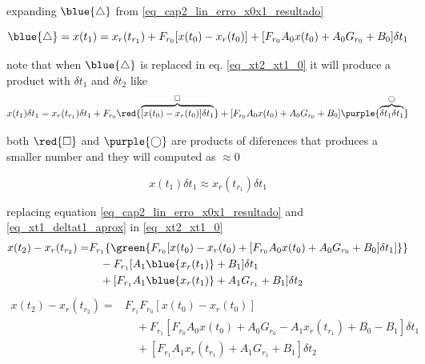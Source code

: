 expanding $\blue{\triangle}$ from \ref{eq_cap2_lin_erro_x0x1_resultado}

\begin{equation}
	\blue{\triangle} = x(t_1) = x_r(t_{r_1}) + F_{r_0} [ x(t_0) - x_r(t_0) ] + [ F_{r_0} A_0 x(t_0) + A_0 G_{r_0} + B_0 ] \delta t_1 
	\nonumber
\end{equation}

note that when $\blue{\triangle}$ is replaced in eq. \ref{eq_xt2_xt1_0} it will produce a product with $\delta t_1$ and $\delta t_2$ like
\begin{equation}
	x(t_1)\delta t_1 = x_r(t_{r_1})\delta t_1 + F_{r_0} \red{\overbrace{ [ x(t_0) - x_r(t_0) ]\delta t_1 }^{\square}} + [ F_{r_0} A_0 x(t_0) + A_0 G_{r_0} + B_0 ] \purple{\overbrace{\delta t_1\delta t_1}^{\bigcirc}} 
	\nonumber
\end{equation}

both $\red{\square}$ and $\purple{\bigcirc}$ are products of diferences that produces a smaller number and they will computed as $\approx 0$

\begin{equation}
	\label{eq_xt1_deltat1_aprox}
	x(t_1)\delta t_1 \approx x_r(t_{r_1})\delta t_1 
\end{equation}

replacing equation \ref{eq_cap2_lin_erro_x0x1_resultado} and \ref{eq_xt1_deltat1_aprox} in \ref{eq_xt2_xt1_0}
\begin{equation}
	\begin{split}
		x(t_2) - x_r(t_{r_2}) =  & F_{r_1} \{\green{
										F_{r_0} [x(t_0) - x_r(t_0) + [F_{r_0} A_0 x(t_0) + A_0 G_{r_0} + B_0] \delta t_1]
								 }\} \\
							     & \quad - F_{r_1} [A_1 \blue{x_r(t_1)} + B_1] \delta t_1 \\
							     & \quad + [ F_{r_1} A_1 \blue{x_r(t_1)} + A_1 G_{r_1} + B_1] \delta t_2
	\end{split}
	\nonumber
\end{equation}
\begin{equation}
	\begin{split}
		x(t_2) - x_r(t_{r_2}) =  & F_{r_1} F_{r_0} [x(t_0) - x_r(t_0)] \\
							     & \quad + F_{r_1} [F_{r_0} A_0 x(t_0) + A_0 G_{r_0} - A_1 x_r(t_{r_1}) + B_0 - B_1] \delta t_1 \\
							     & \quad + [F_{r_1} A_1 x_r(t_{r_1}) + A_1 G_{r_1} + B_1] \delta t_2
	\end{split}
\end{equation}